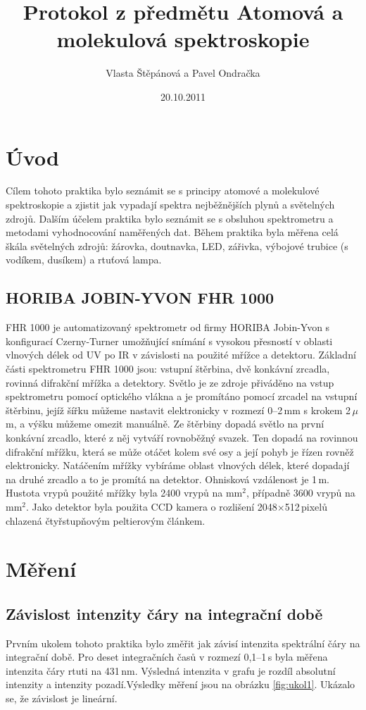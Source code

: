 \documentclass[12pt]{article}
\begin{document}
\title{Protokol z předmětu Atomová a molekulová spektroskopie}
\author{Vlasta Štěpánová a Pavel Ondračka}
\date{20.10.2011}
\maketitle

\section{Úvod}
Cílem tohoto praktika bylo seznámit se s principy atomové a molekulové spektroskopie a zjistit jak vypadají spektra nejběžnějších plynů a světelných zdrojů. Dalším účelem praktika bylo seznámit se s obsluhou spektrometru a metodami vyhodnocování naměřených dat. Během praktika byla měřena celá škála světelných zdrojů: žárovka, doutnavka, LED, zářivka, výbojové trubice (s vodíkem, dusíkem) a rtuťová lampa.

\subsection{HORIBA JOBIN-YVON FHR 1000}
FHR 1000 je automatizovaný spektrometr od firmy HORIBA Jobin-Yvon
s konfigurací Czerny-Turner umožňující snímání s vysokou přesností v oblasti vlnových délek od UV po IR v závislosti na použité mřížce a
detektoru.
Základní části spektrometru FHR 1000 jsou: vstupní štěrbina, dvě konkávní
zrcadla, rovinná difrakční mřížka a detektory.
Světlo je ze zdroje přiváděno na vstup spektrometru pomocí optického vlákna
a je promítáno pomocí zrcadel na vstupní štěrbinu, jejíž šířku můžeme nastavit 
elektronicky v rozmezí 0--2\,mm s krokem 2\,$\mu$m, a výšku můžeme omezit
manuálně. Ze štěrbiny dopadá světlo na
první konkávní zrcadlo, které z něj vytváří rovnoběžný svazek. Ten dopadá
na rovinnou difrakční mřížku, která se může otáčet kolem své osy a její pohyb
je řízen rovněž elektronicky. Natáčením mřížky vybíráme oblast vlnových
délek, které dopadají na druhé zrcadlo a to je promítá na detektor. Ohnisková vzdálenost je 1\,m. Hustota vrypů použité mřížky byla 2400 vrypů na mm$^2$, případně 3600 vrypů na mm$^2$. Jako detektor byla použita CCD kamera o rozlišení 2048$\times$512\,pixelů chlazená čtyřstupňovým peltierovým článkem. 
 
\section{Měření}

\subsection{Závislost intenzity čáry na integrační době}
Prvním ukolem tohoto praktika bylo změřit jak závisí intenzita spektrální čáry na integrační době. Pro deset integračních časů v rozmezí 0,1--1\,s byla měřena intenzita čáry rtuti na 431\,nm. Výsledná intenzita v grafu je rozdíl absolutní intenzity a intenzity pozadí.Výsledky měření jsou na obrázku \ref{fig:ukol1}. Ukázalo se, že závislost je lineární.
\end{document}
